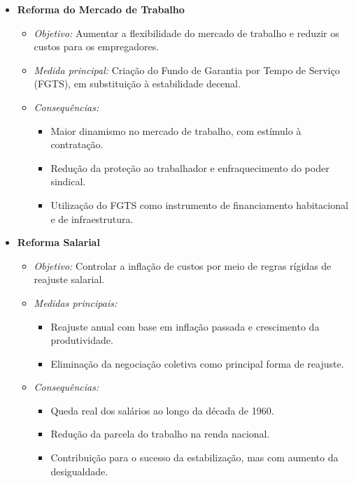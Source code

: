 \documentclass{sciposter}
\begin{document}
\begin{multicols}{3}
\begin{itemize}
    \item \textbf{ Reforma do Mercado de Trabalho}
    \begin{itemize}
        \item \textit{Objetivo:} Aumentar a flexibilidade do mercado de trabalho e reduzir os custos para os empregadores.
        \item \textit{Medida principal:} Criação do Fundo de Garantia por Tempo de Serviço (FGTS), em substituição à estabilidade decenal.
        \item \textit{Consequências:}
        \begin{itemize}
            \item Maior dinamismo no mercado de trabalho, com estímulo à contratação.
            \item Redução da proteção ao trabalhador e enfraquecimento do poder sindical.
            \item Utilização do FGTS como instrumento de financiamento habitacional e de infraestrutura.
        \end{itemize}
    \end{itemize}

    \item \textbf{ Reforma Salarial}
    \begin{itemize}
        \item \textit{Objetivo:} Controlar a inflação de custos por meio de regras rígidas de reajuste salarial.
        \item \textit{Medidas principais:}
        \begin{itemize}
            \item Reajuste anual com base em inflação passada e crescimento da produtividade.
            \item Eliminação da negociação coletiva como principal forma de reajuste.
        \end{itemize}
        \item \textit{Consequências:}
        \begin{itemize}
            \item Queda real dos salários ao longo da década de 1960.
            \item Redução da parcela do trabalho na renda nacional.
            \item Contribuição para o sucesso da estabilização, mas com aumento da desigualdade.
        \end{itemize}
    \end{itemize}
\end{itemize}


\end{multicols}
\end{document}
